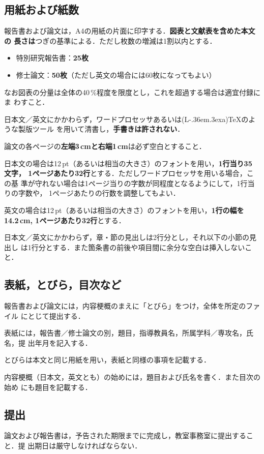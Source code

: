 \documentclass[master]{kuisthesis}		%
\def\LATEX{{\rm (L\kern-.36em\raise.3ex\hbox{\sc a})\TeX}}
\let\EM\bf
\begin{document}
\subsection{用紙および紙数}\label{subsec-format}

報告書および論文は，A4の用紙の片面に印字する．{\EM 図表と文献表を含めた本文の
長さは}つぎの基準による．ただし枚数の増減は1割以内とする．
\begin{itemize}%
\item
特別研究報告書：{\EM 25枚}
\item
修士論文\phantom{あああ}：{\EM 50枚}（ただし英文の場合には60枚になってもよい）
\end{itemize}%
なお図表の分量は全体の40\,\%程度を限度とし，これを超過する場合は適宜付録にま
わすこと．

日本文／英文にかかわらず，ワードプロセッサあるいは\LATEX のような製版ツール
を用いて清書し，{\EM 手書きは許されない}．

論文の各ページの{\EM 左端3\,cmと右端1\,cm}は必ず空白とすること．

日本文の場合は12\,pt（あるいは相当の大きさ）のフォントを用い，{\EM 1行当り35 
文字， 1ページあたり32行}とする．ただしワードプロセッサを用いる場合，この基
準が守れない場合は1ページ当りの字数が同程度となるようにして，1行当りの字数や， 
1ページあたりの行数を調整してもよい．

英文の場合は12\,pt（あるいは相当の大きさ）のフォントを用い，{\EM 1行の幅を
14.2\,cm, 1ページあたり32行}とする．

日本文／英文にかかわらず，章・節の見出しは2行分とし，それ以下の小節の見出し
は1行分とする．また箇条書の前後や項目間に余分な空白は挿入しないこと．

\subsection{表紙，とびら，目次など}\label{subsec-title}
報告書および論文には，内容梗概のまえに「とびら」をつけ，全体を所定のファイル
にとじて提出する．

表紙には，報告書／修士論文の別，題目，指導教員名，所属学科／専攻名，氏名，提
出年月を記入する．

とびらは本文と同じ用紙を用い，表紙と同様の事項を記載する．

内容梗概（日本文，英文とも）の始めには，題目および氏名を書く．また目次の始め
にも題目を記載する．

\subsection{提出}\label{subsec-submission}
論文および報告書は，予告された期限までに完成し，教室事務室に提出すること．提
出期日は厳守しなければならない．

\end{document}
